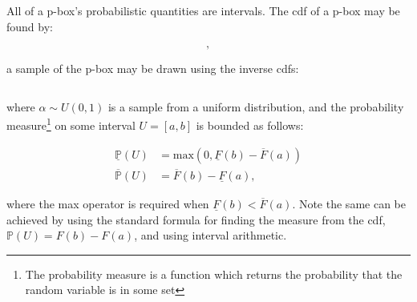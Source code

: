 \documentclass{juliacon}
\begin{document}
All of a p-box's probabilistic quantities are intervals. The cdf of a p-box may be found by: 

\begin{equation*}
  [\underline{F}(x), \overline{F}(x)] ,
\end{equation*}

\noindent a sample of the p-box may be drawn using the inverse cdfs: 

\begin{equation*}
  [\underline{F}^{-1}(\alpha), \overline{F}^{-1}(\alpha)]
\end{equation*}

\noindent where $\alpha \sim U(0,1)$ is a sample from a uniform distribution, and the probability measure\footnote{The probability measure is a function which returns the probability that the random variable is in some set} on some interval $U = [a, b]$ is bounded as follows:

\begin{align*}
  \underline{\mathbb{P}}(U) &= \text{max}(0, \underline{F}(b) - \overline{F}(a)) \\ 
  \overline{\mathbb{P}}(U)  &= \overline{F}(b) - \underline{F}(a) ,
\end{align*}

where the max operator is required when $\underline{F}(b) < \overline{F}(a)$. Note the same can be achieved by using the standard formula for finding the measure from the cdf, $\mathbb{P}(U) = F(b)- F(a)$, and using interval arithmetic.
\end{document}
